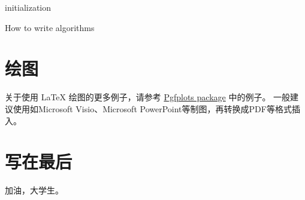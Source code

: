 \begin{algorithm}[H]
  \SetAlgoLined
   initialization\;
  \caption{How to write algorithms}
\end{algorithm}


\section{绘图}

关于使用 \LaTeX{} 绘图的更多例子，请参考 \href{https://www.overleaf.com/learn/latex/Pgfplots_package}{Pgfplots package} 中的例子。
一般建议使用如Microsoft Visio、Microsoft PowerPoint等制图，再转换成PDF等格式插入。

\section{写在最后}
加油，大学生。
